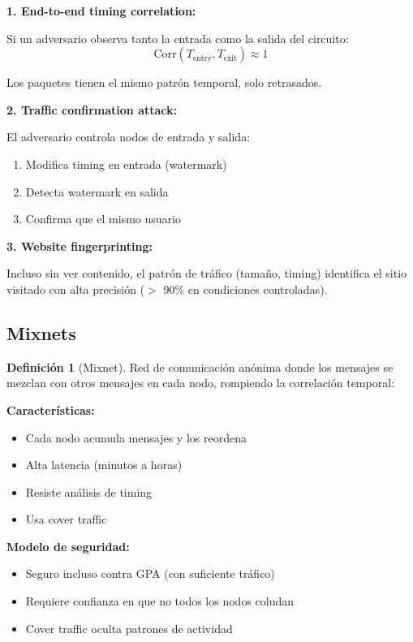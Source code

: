 \documentclass[11pt,a4paper,twoside]{book}
\theoremstyle{definition}
\newtheorem{definition}{Definición}[chapter]
\theoremstyle{remark}
\begin{document}
\begin{mathnote}
\textbf{1. End-to-end timing correlation:}

Si un adversario observa tanto la entrada como la salida del circuito:
\[
\text{Corr}(T_{\text{entry}}, T_{\text{exit}}) \approx 1
\]

Los paquetes tienen el mismo patrón temporal, solo retrasados.

\textbf{2. Traffic confirmation attack:}

El adversario controla nodos de entrada y salida:
\begin{enumerate}
    \item Modifica timing en entrada (watermark)
    \item Detecta watermark en salida
    \item Confirma que el mismo usuario
\end{enumerate}

\textbf{3. Website fingerprinting:}

Incluso sin ver contenido, el patrón de tráfico (tamaño, timing) identifica el sitio visitado con alta precisión ($>$ 90\% en condiciones controladas).
\end{mathnote}

\subsection{Mixnets}

\begin{definition}[Mixnet]
Red de comunicación anónima donde los mensajes se mezclan con otros mensajes en cada nodo, rompiendo la correlación temporal:

\textbf{Características:}
\begin{itemize}
    \item Cada nodo acumula mensajes y los reordena
    \item Alta latencia (minutos a horas)
    \item Resiste análisis de timing
    \item Usa cover traffic
\end{itemize}

\textbf{Modelo de seguridad:}
\begin{itemize}
    \item Seguro incluso contra GPA (con suficiente tráfico)
    \item Requiere confianza en que no todos los nodos coludan
    \item Cover traffic oculta patrones de actividad
\end{itemize}
\end{definition}
\end{document}
